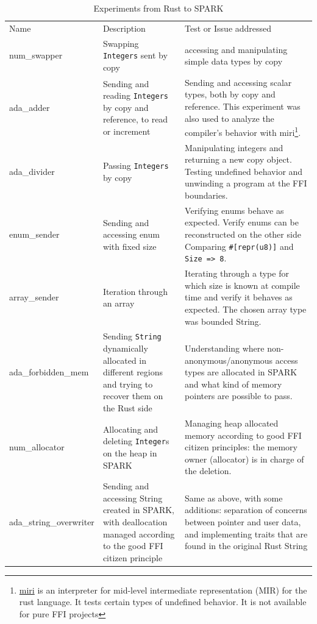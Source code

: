 \documentclass[nomenclature, english, bibtex]{kththesis}
\begin{document}
\begin{table}[ht!]
\footnotesize
\centering
\caption{Experiments from Rust to SPARK}
\label{tab:fromrusttospark}
\begin{tabular}{ |p{3cm}|p{4cm}|p{7cm}| }
\hline
\rowcolor{color2bg_fill}
\multicolumn{3}{|c|}{\centering From SPARK to Rust} \\
\hline
\rowcolor{color2bg_fill}
\centering Name & \centering Description & \centering Test or Issue addressed \tabularnewline
\hline
num\_swapper & Swapping \texttt{Integers} sent by copy & accessing and manipulating simple data types by copy \tabularnewline
\hline
ada\_adder & Sending and reading \texttt{Integers} by copy and reference, to read or increment & Sending and accessing scalar types, both by copy and reference. This experiment was also used to analyze the compiler's behavior with miri\footnote{\href{https://github.com/rust-lang/miri/}{miri} is an interpreter for mid-level intermediate representation (MIR) for the rust language. It tests certain types of undefined behavior. It is not available for pure FFI projects}. \tabularnewline
\hline
ada\_divider & Passing \texttt{Integers} by copy & Manipulating integers and returning a new copy object. \newline Testing undefined behavior and unwinding a program at the FFI boundaries. \tabularnewline
\hline
enum\_sender & Sending and accessing enum with fixed size & Verifying enums behave as expected. \newline Verify enums can be reconstructed on the other side \newline Comparing \texttt{\#[repr(u8)]} and \texttt{Size => 8}. \tabularnewline
\hline
array\_sender & Iteration through an array  & Iterating through a type for which size is known at compile time and verify it behaves as expected. The chosen array type was bounded String. \tabularnewline
\hline
ada\_forbidden\_mem & Sending \texttt{String} dynamically allocated in different regions and trying to recover them on the Rust side & Understanding where non-anonymous/anonymous access types are allocated in SPARK and what kind of memory pointers are possible to pass.\tabularnewline
\hline
num\_allocator & Allocating and deleting \texttt{Integer}s on the heap in SPARK & Managing heap allocated memory according to good FFI citizen principles: the memory owner (allocator) is in charge of the deletion. \tabularnewline
\hline
ada\_string\_overwriter & Sending and accessing String created in SPARK, with deallocation managed according to the good FFI citizen principle & Same as above, with some additions: separation of concerns between pointer and user data, and implementing traits that are found in the original Rust String \tabularnewline
\hline
\end{tabular}
\end{table}
\FloatBarrier
{}
\end{document}
